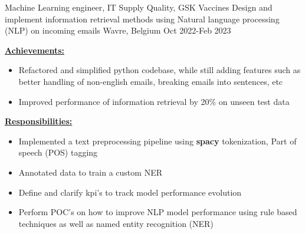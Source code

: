 
\vspace{2mm}

\begin{cventries}
  \cventry
    {Machine Learning engineer, IT Supply Quality, GSK Vaccines} %
    {Design and implement information retrieval methods using Natural language processing (NLP) on incoming emails} %
    {Wavre, Belgium} %
    {Oct 2022-Feb 2023} %
    {
    \begin{cvitems}
    \item {\underline{\textbf{Achievements:}}}
            \begin{itemize}
                \item {Refactored and simplified python codebase, while still adding features such as better handling of non-english emails, breaking emails into sentences, etc}
                \item {Improved performance of information retrieval by 20\% on unseen test data}
            \end{itemize}
        \item {\underline{\textbf{Responsibilities:}}}
         \begin{itemize}
            \item {Implemented a text preprocessing pipeline using \textbf{spacy} tokenization, Part of speech (POS) tagging}
            \item {Annotated data to train a custom NER}
            \item {Define and clarify kpi's to track model performance evolution}
            \item {Perform POC's on how to improve NLP model performance using rule based techniques as well as named entity recognition (NER)} 
        \end{itemize}
    \end{cvitems}
    }
\end{cventries}